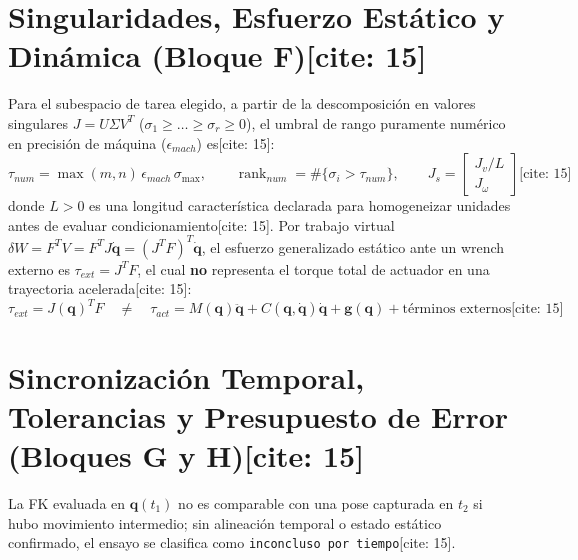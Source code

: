 \documentclass[10pt, a4paper]{article}
\begin{document}
\section{Singularidades, Esfuerzo Estático y Dinámica (Bloque F)[cite: 15]}
Para el subespacio de tarea elegido, a partir de la descomposición en valores singulares $J = U\Sigma V^T$ ($\sigma_1 \ge \dots \ge \sigma_r \ge 0$), el umbral de rango puramente numérico en precisión de máquina ($\epsilon_{mach}$) es[cite: 15]:
\begin{equation}
    \tau_{num} = \max(m,n)\,\epsilon_{mach}\,\sigma_{\max}, \qquad
    \operatorname{rank}_{num} = \#\{\sigma_i > \tau_{num}\}, \qquad
    J_s = \begin{bmatrix} J_v / L \\ J_\omega \end{bmatrix} \text{[cite: 15]}
\end{equation}
donde $L > 0$ es una longitud característica declarada para homogeneizar unidades antes de evaluar condicionamiento[cite: 15]. Por trabajo virtual $\delta W = F^T V = F^T J\dot{\mathbf{q}} = (J^T F)^T \dot{\mathbf{q}}$, el esfuerzo generalizado estático ante un wrench externo es $\tau_{ext} = J^T F$, el cual \textbf{no} representa el torque total de actuador en una trayectoria acelerada[cite: 15]:
\begin{equation}
    \boxed{ \tau_{ext} = J(\mathbf{q})^T F \quad \neq \quad \tau_{act} = M(\mathbf{q})\ddot{\mathbf{q}} + C(\mathbf{q},\dot{\mathbf{q}})\dot{\mathbf{q}} + \mathbf{g}(\mathbf{q}) + \text{términos externos} } \text{[cite: 15]}
\end{equation}

\section{Sincronización Temporal, Tolerancias y Presupuesto de Error (Bloques G y H)[cite: 15]}
La FK evaluada en $\mathbf{q}(t_1)$ no es comparable con una pose capturada en $t_2$ si hubo movimiento intermedio; sin alineación temporal o estado estático confirmado, el ensayo se clasifica como \texttt{inconcluso por tiempo}[cite: 15].
\end{document}
